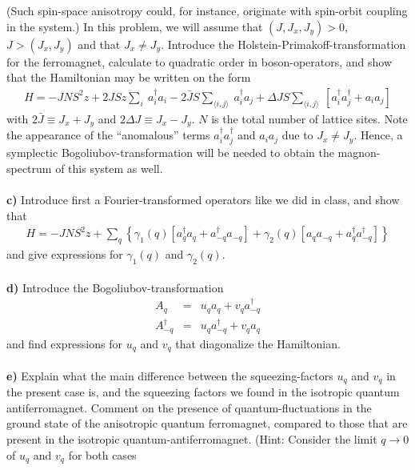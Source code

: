 \documentclass{article}
\begin{document}
(Such spin-space anisotropy could, for instance, originate with spin-orbit coupling in the system.) 
In this problem, we will assume that $(J,J_x,J_y) >0$, $J > (J_x,J_y) $ and that $J_x \neq J_y$. Introduce the Holstein-Primakoff-transformation for the ferromagnet, calculate to quadratic order in boson-operators, and show that the Hamiltonian may be written on the form
\begin{eqnarray}
H = -J N S^2 z + 2 J S z \sum_i ~ a^{\dagger}_i a_i 
- 2 \bar{J} S  \sum_{\langle i,j \rangle} ~  a^{\dagger}_i a_j 
+ \Delta J S \sum_{\langle i,j \rangle} ~  \left[  a^{\dagger}_i a^{\dagger}_j +  a_i a_j \right] \nonumber 
\end{eqnarray}
with $2 \bar{J} \equiv J_x+J_y$ and $2  \Delta J \equiv J_x-J_y$. $N$ is the total number of lattice sites. Note the appearance of the ``anomalous'' terms 
$a^{\dagger}_i a^{\dagger}_j $ and $a_i a_j$ due to 
$J_x \neq J_y$.  Hence, a symplectic Bogoliubov-transformation will be needed to obtain the magnon-spectrum of this system as well. 
\ \\
\ \\
{\bf c)} Introduce first a Fourier-transformed operators like we did in class, and show that 
\begin{eqnarray}
H = -J N S^2 z + \sum_{q}\left\{  \gamma_1(q) \left[ a^{\dagger}_q a_q + a^{\dagger}_{-q} a_{-q}  \right] +  \gamma_2(q) \left[ a_q a_{-q} + a^{\dagger}_{q} a^{\dagger}_{-q}  \right]\right\} \nonumber 
\end{eqnarray}
and give expressions for $\gamma_1(q)$ and $\gamma_2(q)$.
\ \\
\ \\
{\bf d)} Introduce the Bogoliubov-transformation
\begin{eqnarray}
A_{q} & = & u_q a_q + v_q a^{\dagger}_{-q}  \nonumber \\
A^{\dagger}_{-q} & = & u_q a^{\dagger}_{-q} + v_q a_{q}  \nonumber
\end{eqnarray}
and find expressions for $u_q$ and $v_q$ that diagonalize the Hamiltonian. 
\ \\
\ \\
{\bf e)} Explain what the main difference between the squeezing-factors  $u_q$ and $v_q$ in the present case is, and the squeezing factors we found in the isotropic quantum antiferromagnet.  Comment on the presence of quantum-fluctuations in the ground state of the anisotropic quantum ferromagnet, compared to those that are present in the isotropic quantum-antiferromagnet. (Hint: Consider the limit $q \to 0$ of $u_q$ and $v_q$ for both cases
\end{document}
